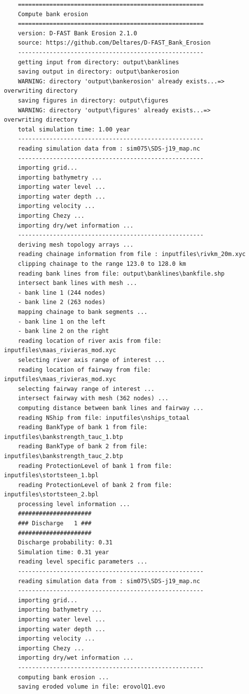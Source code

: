 \newpage
\begin{Verbatim}
	=====================================================
	Compute bank erosion
	=====================================================
	version: D-FAST Bank Erosion 2.1.0
	source: https://github.com/Deltares/D-FAST_Bank_Erosion
	-----------------------------------------------------
	getting input from directory: output\banklines
	saving output in directory: output\bankerosion
	WARNING: directory 'output\bankerosion' already exists...=> overwriting directory
	saving figures in directory: output\figures
	WARNING: directory 'output\figures' already exists...=> overwriting directory
	total simulation time: 1.00 year
	-----------------------------------------------------
	reading simulation data from : sim075\SDS-j19_map.nc
	-----------------------------------------------------
	importing grid...
	importing bathymetry ...
	importing water level ...
	importing water depth ...
	importing velocity ...
	importing Chezy ...
	importing dry/wet information ...
	-----------------------------------------------------
	deriving mesh topology arrays ...
	reading chainage information from file : inputfiles\rivkm_20m.xyc
	clipping chainage to the range 123.0 to 128.0 km
	reading bank lines from file: output\banklines\bankfile.shp
	intersect bank lines with mesh ...
	- bank line 1 (244 nodes)
	- bank line 2 (263 nodes)
	mapping chainage to bank segments ...
	- bank line 1 on the left
	- bank line 2 on the right
	reading location of river axis from file: inputfiles\maas_rivieras_mod.xyc
	selecting river axis range of interest ...
	reading location of fairway from file: inputfiles\maas_rivieras_mod.xyc
	selecting fairway range of interest ...
	intersect fairway with mesh (362 nodes) ...
	computing distance between bank lines and fairway ...
	reading NShip from file: inputfiles\nships_totaal
	reading BankType of bank 1 from file: inputfiles\bankstrength_tauc_1.btp
	reading BankType of bank 2 from file: inputfiles\bankstrength_tauc_2.btp
	reading ProtectionLevel of bank 1 from file: inputfiles\stortsteen_1.bpl
	reading ProtectionLevel of bank 2 from file: inputfiles\stortsteen_2.bpl
	processing level information ...
	#####################
	### Discharge   1 ###
	#####################
	Discharge probability: 0.31
	Simulation time: 0.31 year
	reading level specific parameters ...
	-----------------------------------------------------
	reading simulation data from : sim075\SDS-j19_map.nc
	-----------------------------------------------------
	importing grid...
	importing bathymetry ...
	importing water level ...
	importing water depth ...
	importing velocity ...
	importing Chezy ...
	importing dry/wet information ...
	-----------------------------------------------------
	computing bank erosion ...
	saving eroded volume in file: erovolQ1.evo
	

\end{Verbatim}
